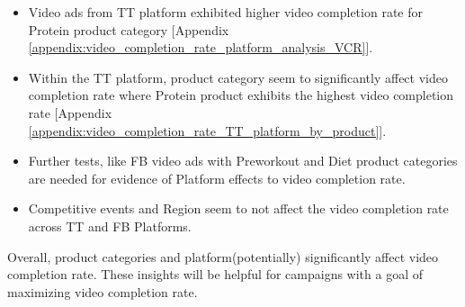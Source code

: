 \begin{itemize}
	
	\item Video ads from TT platform exhibited higher video completion rate for Protein product category [Appendix \ref{appendix:video_completion_rate_platform_analysis_VCR}].
	
	\item Within the TT platform, product category seem to significantly affect video completion rate where Protein product exhibits the highest video completion rate [Appendix \ref{appendix:video_completion_rate_TT_platform_by_product}].
	
	\item Further tests, like FB video ads with Preworkout and Diet product categories are needed for evidence of Platform effects to video completion rate.
	
	\item Competitive events and Region seem to not affect the video completion rate across TT and FB Platforms.
\end{itemize}

Overall, product categories and platform(potentially) significantly affect video completion rate. These insights will be helpful for campaigns with a goal of maximizing video completion rate.




